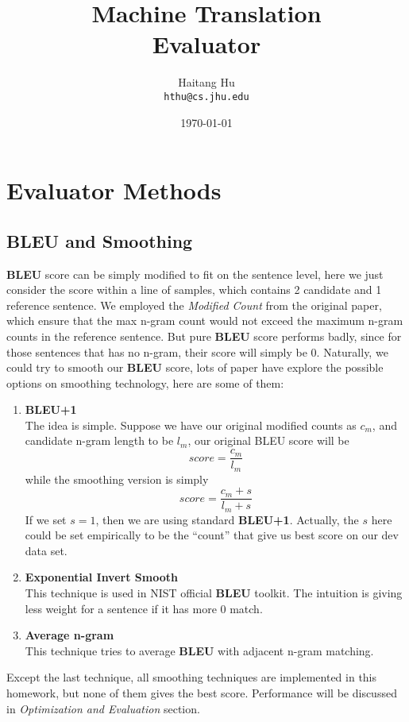 \documentclass[11pt]{article}
\title{Machine Translation\\Evaluator}
\author{Haitang Hu \\
  {\tt hthu@cs.jhu.edu}}
\date{\today}
\begin{document}
\large
\maketitle
\thispagestyle{headings}
\section{Evaluator Methods} %
\label{sec:evaluator_methods}
\subsection{BLEU and Smoothing} %
\label{sub:bleu_and_smoothing}
\textbf{BLEU} score\cite{bleu} can be simply modified to fit on the sentence level, here we just consider the score within a line of samples, which contains 2 candidate and 1 reference sentence. We employed the \textit{Modified Count} from the original paper, which ensure that the max n-gram count would not exceed the maximum n-gram counts in the reference sentence. But pure \textbf{BLEU} score performs badly, since for those sentences that has no n-gram, their score will simply be 0. Naturally, we could try to smooth our \textbf{BLEU} score, lots of paper have explore the possible options on smoothing technology, here are some of them:
\begin{enumerate}
	\item \textbf{BLEU+1}\cite{sbleu}\\
	The idea is simple. Suppose we have our original modified counts as $c_m$, and candidate n-gram length to be $l_m$, our original BLEU score will be
	$$ score = \frac{c_m}{l_m}$$
	while the smoothing version is simply 
	$$ score = \frac{c_m+s}{l_m+s}$$
	If we set $s=1$, then we are using standard \textbf{BLEU+1}. Actually, the $s$ here could be set empirically to be the ``count'' that give us best score on our dev data set.
	\item \textbf{Exponential Invert Smooth}\cite{sybleu}\\
	This technique is used in NIST official \textbf{BLEU} toolkit. The intuition is giving less weight for a sentence if it has more $0$ match.
	\item \textbf{Average n-gram}\cite{sybleu}\\
	This technique tries to average \textbf{BLEU} with adjacent n-gram matching.
\end{enumerate}
Except the last technique, all smoothing techniques are implemented in this homework, but none of them gives the best score. Performance will be discussed in \textit{Optimization and Evaluation} section.
\end{document}
